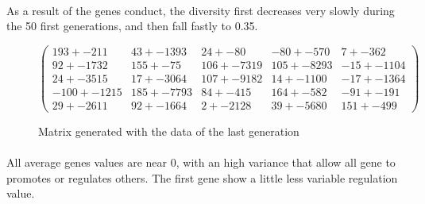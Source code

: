 \documentclass[]{report} %
\begin{document}
    \paragraph*{} 
    As a result of the genes conduct, the diversity first decreases very slowly during the 50 first generations, and then fall fastly to 0.35. 

    \begin{figure}[H] 
            \centering
            \small
    $
            \begin{pmatrix}
                  193 +- 211    & 43 +- 1393    & 24 +- 80      & -80 +- 570    & 7 +- 362 \\
                  92 +- 1732    & 155 +- 75     & 106 +- 7319   & 105 +- 8293   & -15 +- 1104 \\
                  24 +- 3515    & 17 +- 3064    & 107 +- 9182   & 14 +- 1100    & -17 +- 1364 \\
                  -100 +- 1215  & 185 +- 7793   & 84 +- 415     & 164 +- 582    & -91 +- 191 \\
                  29 +- 2611    & 92 +- 1664    & 2 +- 2128     & 39 +- 5680    & 151 +- 499 
            \end{pmatrix}
    $
            \caption{\footnotesize Matrix generated with the data of the last generation}
            \label{mat:ps300xg200xmr1-10-5}
    \end{figure}
    \paragraph*{}
    All average genes values are near 0, with an high variance that allow all gene to promotes or regulates others. 
    The first gene show a little less variable regulation value.
\end{document}
